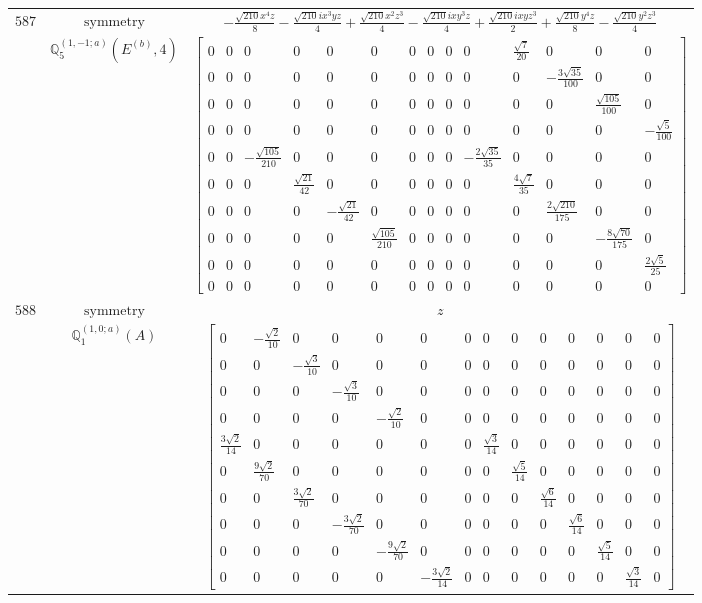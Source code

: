 \documentclass[fleqn,8pt,landscape]{jsarticle}
\begin{document}
\begin{longtable}{ccc}
$ 587 $ & $ \text{symmetry} $ & $ - \frac{\sqrt{210} x^{4} z}{8} - \frac{\sqrt{210} i x^{3} y z}{4} + \frac{\sqrt{210} x^{2} z^{3}}{4} - \frac{\sqrt{210} i x y^{3} z}{4} + \frac{\sqrt{210} i x y z^{3}}{2} + \frac{\sqrt{210} y^{4} z}{8} - \frac{\sqrt{210} y^{2} z^{3}}{4} $ \\
$  $ & $ \mathbb{Q}_{5}^{(1,-1;a)}(E^{(b)},4) $ & $ \begin{bmatrix} 0 & 0 & 0 & 0 & 0 & 0 & 0 & 0 & 0 & 0 & \frac{\sqrt{7}}{20} & 0 & 0 & 0 \\ 0 & 0 & 0 & 0 & 0 & 0 & 0 & 0 & 0 & 0 & 0 & - \frac{3 \sqrt{35}}{100} & 0 & 0 \\ 0 & 0 & 0 & 0 & 0 & 0 & 0 & 0 & 0 & 0 & 0 & 0 & \frac{\sqrt{105}}{100} & 0 \\ 0 & 0 & 0 & 0 & 0 & 0 & 0 & 0 & 0 & 0 & 0 & 0 & 0 & - \frac{\sqrt{5}}{100} \\ 0 & 0 & - \frac{\sqrt{105}}{210} & 0 & 0 & 0 & 0 & 0 & 0 & - \frac{2 \sqrt{35}}{35} & 0 & 0 & 0 & 0 \\ 0 & 0 & 0 & \frac{\sqrt{21}}{42} & 0 & 0 & 0 & 0 & 0 & 0 & \frac{4 \sqrt{7}}{35} & 0 & 0 & 0 \\ 0 & 0 & 0 & 0 & - \frac{\sqrt{21}}{42} & 0 & 0 & 0 & 0 & 0 & 0 & \frac{2 \sqrt{210}}{175} & 0 & 0 \\ 0 & 0 & 0 & 0 & 0 & \frac{\sqrt{105}}{210} & 0 & 0 & 0 & 0 & 0 & 0 & - \frac{8 \sqrt{70}}{175} & 0 \\ 0 & 0 & 0 & 0 & 0 & 0 & 0 & 0 & 0 & 0 & 0 & 0 & 0 & \frac{2 \sqrt{5}}{25} \\ 0 & 0 & 0 & 0 & 0 & 0 & 0 & 0 & 0 & 0 & 0 & 0 & 0 & 0 \end{bmatrix} $ \\ \hline
$ 588 $ & $ \text{symmetry} $ & $ z $ \\
$  $ & $ \mathbb{Q}_{1}^{(1,0;a)}(A) $ & $ \begin{bmatrix} 0 & - \frac{\sqrt{2}}{10} & 0 & 0 & 0 & 0 & 0 & 0 & 0 & 0 & 0 & 0 & 0 & 0 \\ 0 & 0 & - \frac{\sqrt{3}}{10} & 0 & 0 & 0 & 0 & 0 & 0 & 0 & 0 & 0 & 0 & 0 \\ 0 & 0 & 0 & - \frac{\sqrt{3}}{10} & 0 & 0 & 0 & 0 & 0 & 0 & 0 & 0 & 0 & 0 \\ 0 & 0 & 0 & 0 & - \frac{\sqrt{2}}{10} & 0 & 0 & 0 & 0 & 0 & 0 & 0 & 0 & 0 \\ \frac{3 \sqrt{2}}{14} & 0 & 0 & 0 & 0 & 0 & 0 & \frac{\sqrt{3}}{14} & 0 & 0 & 0 & 0 & 0 & 0 \\ 0 & \frac{9 \sqrt{2}}{70} & 0 & 0 & 0 & 0 & 0 & 0 & \frac{\sqrt{5}}{14} & 0 & 0 & 0 & 0 & 0 \\ 0 & 0 & \frac{3 \sqrt{2}}{70} & 0 & 0 & 0 & 0 & 0 & 0 & \frac{\sqrt{6}}{14} & 0 & 0 & 0 & 0 \\ 0 & 0 & 0 & - \frac{3 \sqrt{2}}{70} & 0 & 0 & 0 & 0 & 0 & 0 & \frac{\sqrt{6}}{14} & 0 & 0 & 0 \\ 0 & 0 & 0 & 0 & - \frac{9 \sqrt{2}}{70} & 0 & 0 & 0 & 0 & 0 & 0 & \frac{\sqrt{5}}{14} & 0 & 0 \\ 0 & 0 & 0 & 0 & 0 & - \frac{3 \sqrt{2}}{14} & 0 & 0 & 0 & 0 & 0 & 0 & \frac{\sqrt{3}}{14} & 0 \end{bmatrix} $ \\ \hline

\end{longtable}
\end{document}
